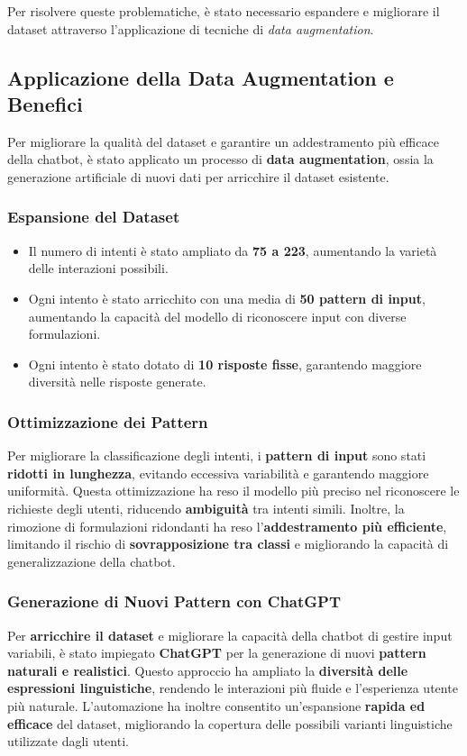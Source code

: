 \documentclass[12pt, letterpaper]{article}
\begin{document}
Per risolvere queste problematiche, è stato necessario espandere e migliorare il dataset attraverso l’applicazione di tecniche di \textit{data augmentation}.

\subsection{Applicazione della Data Augmentation e Benefici}
Per migliorare la qualità del dataset e garantire un addestramento più efficace della chatbot, è stato applicato un processo di \textbf{data augmentation}, ossia la generazione artificiale di nuovi dati per arricchire il dataset esistente.

\subsubsection{Espansione del Dataset}
\begin{itemize}
	\item Il numero di intenti è stato ampliato da \textbf{75 a 223}, aumentando la varietà delle interazioni possibili.
	\item Ogni intento è stato arricchito con una media di \textbf{50 pattern di input}, aumentando la capacità del modello di riconoscere input con diverse formulazioni.
	\item Ogni intento è stato dotato di \textbf{10 risposte fisse}, garantendo maggiore diversità nelle risposte generate.
\end{itemize}

\subsubsection{Ottimizzazione dei Pattern}
Per migliorare la classificazione degli intenti, i \textbf{pattern di input} sono stati \textbf{ridotti in lunghezza}, evitando eccessiva variabilità e garantendo maggiore uniformità. Questa ottimizzazione ha reso il modello più preciso nel riconoscere le richieste degli utenti, riducendo \textbf{ambiguità} tra intenti simili. Inoltre, la rimozione di formulazioni ridondanti ha reso l’\textbf{addestramento più efficiente}, limitando il rischio di \textbf{sovrapposizione tra classi} e migliorando la capacità di generalizzazione della chatbot.

\subsubsection{Generazione di Nuovi Pattern con ChatGPT}
Per \textbf{arricchire il dataset} e migliorare la capacità della chatbot di gestire input variabili, è stato impiegato \textbf{ChatGPT} per la generazione di nuovi \textbf{pattern naturali e realistici}. Questo approccio ha ampliato la \textbf{diversità delle espressioni linguistiche}, rendendo le interazioni più fluide e l’esperienza utente più naturale. L’automazione ha inoltre consentito un’espansione \textbf{rapida ed efficace} del dataset, migliorando la copertura delle possibili varianti linguistiche utilizzate dagli utenti.
\end{document}
